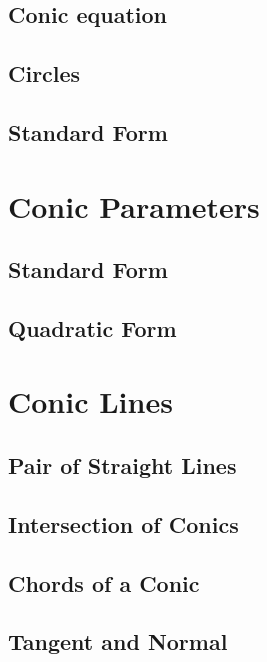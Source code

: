 \documentclass[11pt]{book}
\begin{document}
\section{Conic equation }
\section{Circles}

\section{Standard Form}
\chapter{Conic Parameters}
\section{Standard Form}
\section{Quadratic Form }

\chapter{Conic Lines}
\section{Pair of Straight Lines}
%
\section{Intersection of Conics}
\section{ Chords of a Conic}
\section{ Tangent and Normal}
\fi
%

%
%
%
\latexprintindex
\end{document}
